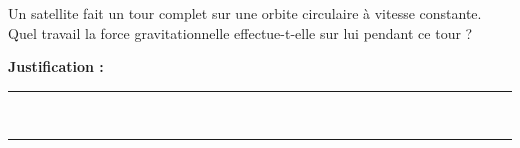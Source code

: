Un satellite fait un tour complet sur une orbite circulaire à vitesse constante. Quel travail la force gravitationnelle effectue-t-elle sur lui pendant ce tour ?

\choices

\noindent\textbf{Justification :} \hrulefill \\[2.5ex]
\rule{\linewidth}{0.4pt} \\[2.5ex]
\rule{\linewidth}{0.4pt}
\vfill
